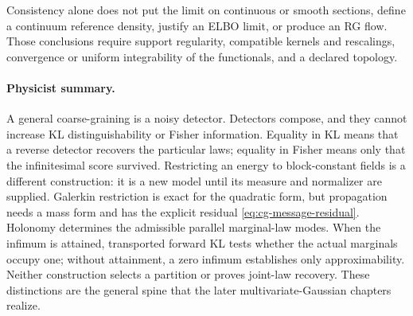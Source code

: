 Consistency alone does not put the limit on continuous or smooth sections,
define a continuum reference density, justify an ELBO limit, or produce an RG
flow. Those conclusions require support regularity, compatible kernels and
rescalings, convergence or uniform integrability of the functionals, and a
declared topology. 

\paragraph{Physicist summary.}
A general coarse-graining is a noisy detector. Detectors compose, and they
cannot increase KL distinguishability or Fisher information. Equality in KL
means that a reverse detector recovers the particular laws; equality in
Fisher means only that the infinitesimal score survived. Restricting an energy
to block-constant fields is a different construction: it is a new model until
its measure and normalizer are supplied. Galerkin restriction is exact for
the quadratic form, but propagation needs a mass form and has the explicit
residual \eqref{eq:cg-message-residual}. Holonomy determines the admissible
parallel marginal-law modes. When the infimum is attained, transported
forward KL tests whether the actual marginals occupy one; without attainment,
a zero infimum establishes only approximability. Neither construction selects
a partition or proves joint-law recovery. These distinctions are the general
spine that the later multivariate-Gaussian chapters realize.
